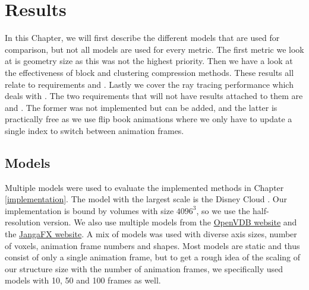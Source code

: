 \section{Results} \label{results}
In this Chapter, we will first describe the different models that are used for comparison, but not all models are used for every metric. The first metric we look at is geometry size as this was not the highest priority. Then we have a look at the effectiveness of block and clustering compression methods. These results all relate to requirements  and . Lastly we cover the ray tracing performance which deals with . The two requirements that will not have results attached to them are  and . The former was not implemented but can be added, and the latter is practically free as we use flip book animations where we only have to update a single index to switch between animation frames.


\subsection{Models} \label{results:models}
Multiple models were used to evaluate the implemented methods in Chapter \ref{implementation}. The model with the largest scale is the Disney Cloud \cite{DisneyCloud}. Our implementation is bound by volumes with size $4096^3$, so we use the half-resolution version. We also use multiple models from the \href{https://www.openvdb.org/download/}{OpenVDB website} and the \href{https://jangafx.com/software/embergen/download/free-vdb-animations/}{JangaFX website}. A mix of models was used with diverse axis sizes, number of voxels, animation frame numbers and shapes. Most models are static and thus consist of only a single animation frame, but to get a rough idea of the scaling of our structure size with the number of animation frames, we specifically used models with 10, 50 and 100 frames as well.

